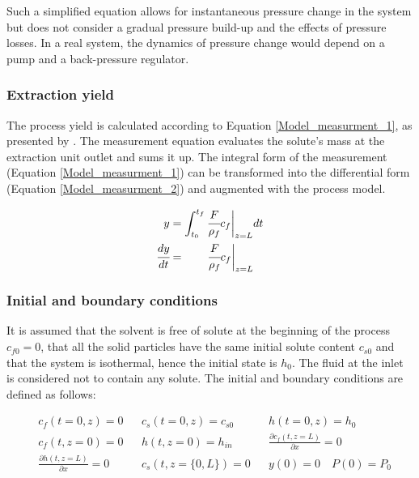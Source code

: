 \documentclass[a4paper,fleqn]{cas-dc}
\begin{document}
	Such a simplified equation allows for instantaneous pressure change in the system but does not consider a gradual pressure build-up and the effects of pressure losses. In a real system, the dynamics of pressure change would depend on a pump and a back-pressure regulator.
	
	\subsubsection{Extraction yield} \label{CH: Yield}
	
	The process yield is calculated according to Equation \ref{Model_measurment_1}, as presented by \citet{Sovova1994a}. The measurement equation evaluates the solute's mass at the extraction unit outlet and sums it up. The integral form of the measurement (Equation \ref{Model_measurment_1}) can be transformed into the differential form (Equation \ref{Model_measurment_2}) and augmented with the process model.
	
	{\footnotesize
		\begin{align} 
			\label{Model_measurment_1}
			y &= \int_{t_0}^{t_f} \cfrac{F}{\rho_f} c_f \biggr\rvert_{z=L} dt \\
			\cfrac{dy}{dt} &= \qquad \cfrac{F}{\rho_f} c_f \biggr\rvert_{z=L} 
			\label{Model_measurment_2}
	\end{align}	}
	
	\subsubsection{Initial and boundary conditions} 
	It is assumed that the solvent is free of solute at the beginning of the process $c_{f0}=0$, that all the solid particles have the same initial solute content $c_{s0}$ and that the system is isothermal, hence the initial state is $h_0$. The fluid at the inlet is considered not to contain any solute. The initial and boundary conditions are defined as follows:
	
	{\footnotesize
		\begin{align*}
			&c_f(t = 0, z) = 0  && c_s(t = 0, z) = c_{s0} && h(t = 0, z) = h_0 \\
			&c_f(t,   z=0) = 0  && h(t, z=0) = h_{in}  && \frac{\partial c_f(t,z=L)}{\partial x} = 0 \\
			&\frac{\partial h(t,z=L)}{\partial x} = 0   && c_s(t, z=\{0,L\}) = 0 && y(0) = 0 \quad P(0) = P_0 \\
	\end{align*} }
	
\end{document}
